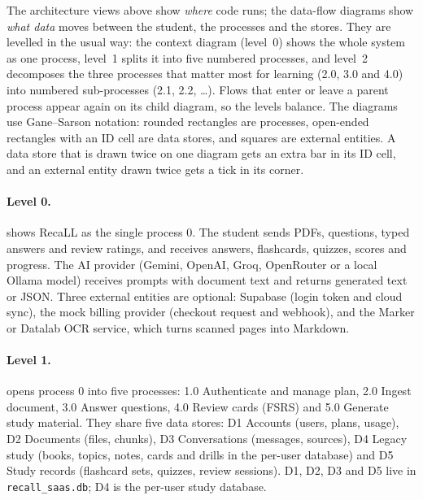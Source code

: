 The architecture views above show \emph{where} code runs; the data-flow diagrams show
\emph{what data} moves between the student, the processes and the stores. They are
levelled in the usual way: the context diagram (level~0) shows the whole system as one
process, level~1 splits it into five numbered processes, and level~2 decomposes the
three processes that matter most for learning (2.0, 3.0 and 4.0) into numbered
sub-processes (2.1, 2.2, \ldots). Flows that enter or leave a parent process appear
again on its child diagram, so the levels balance. The diagrams use Gane--Sarson
notation: rounded rectangles are processes, open-ended rectangles with an ID cell are
data stores, and squares are external entities. A data store that is drawn twice on one
diagram gets an extra bar in its ID cell, and an external entity drawn twice gets a
tick in its corner.


\paragraph{Level 0.}  shows RecaLL as the single process 0. The student
sends PDFs, questions, typed answers and review ratings, and receives answers,
flashcards, quizzes, scores and progress. The AI provider (Gemini, OpenAI, Groq,
OpenRouter or a local Ollama model) receives prompts with document text and returns
generated text or JSON. Three external entities are optional: Supabase (login token and
cloud sync), the mock billing provider (checkout request and webhook), and the Marker or
Datalab OCR service, which turns scanned pages into Markdown.


\paragraph{Level 1.}  opens process 0 into five processes: 1.0
Authenticate and manage plan, 2.0 Ingest document, 3.0 Answer questions, 4.0 Review
cards (FSRS) and 5.0 Generate study material. They share five data stores: D1 Accounts
(users, plans, usage), D2 Documents (files, chunks), D3 Conversations (messages,
sources), D4 Legacy study (books, topics, notes, cards and drills in the per-user
database) and D5 Study records (flashcard sets, quizzes, review sessions). D1, D2, D3 and
D5 live in \texttt{recall\_saas.db}; D4 is the per-user study database.


